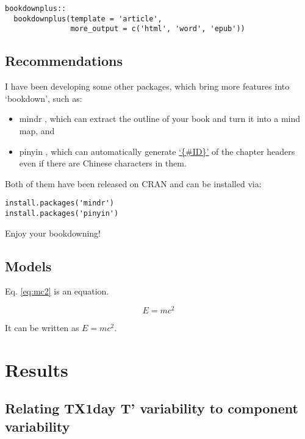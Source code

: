 \documentclass[11pt,a4paper,twoside,openright]{report}
\theoremstyle{definition}
\numberwithin{equation}{subsection}
\begin{document}
\begin{verbatim}
bookdownplus::
  bookdownplus(template = 'article',
               more_output = c('html', 'word', 'epub'))
\end{verbatim}

\hypertarget{recommendations}{%
\section{Recommendations}\label{recommendations}}

I have been developing some other packages, which bring more features into
`bookdown', such as:

\begin{itemize}
\item
  mindr \citep{R-mindr}, which can extract the outline of your book and turn it into
  a mind map, and
\item
  pinyin \citep{R-pinyin}, which can automatically generate \href{https://bookdown.org/yihui/bookdown/cross-references.html}{`\{\#ID\}'} of the
  chapter headers even if there are Chinese characters in them.
\end{itemize}

Both of them have been released on CRAN and can be installed via:

\begin{verbatim}
install.packages('mindr')
install.packages('pinyin')
\end{verbatim}

Enjoy your bookdowning!

\hypertarget{models}{%
\section{Models}\label{models}}

Eq. \eqref{eq:mc2} is an equation.

\begin{equation}
E = mc^2
  \label{eq:mc2}
\end{equation}

It can be written as \(E = mc^2\).

\hypertarget{results}{%
\chapter{Results}\label{results}}

\hypertarget{relating-tx1day-t-variability-to-component-variability}{%
\section{Relating TX1day T' variability to component variability}\label{relating-tx1day-t-variability-to-component-variability}}
\end{document}
